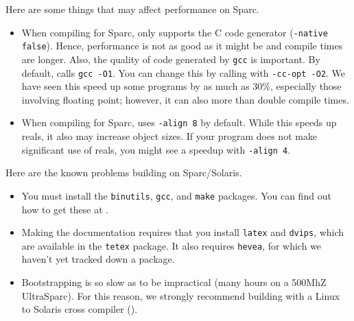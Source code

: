 
Here are some things that may affect performance on Sparc.
\begin{itemize}

\item
When compiling for Sparc, {\mlton} only supports the C code generator
({\tt -native false}).  Hence, performance is not as good as it might
be and compile times are longer.  Also, the quality of code generated
by {\tt gcc} is important.  By default, {\mlton} calls {\tt gcc -O1}.
You can change this by calling {\mlton} with {\tt -cc-opt -O2}.  We
have seen this speed up some programs by as much as 30\%, especially
those involving floating point; however, it can also more than double
compile times.

\item
When compiling for Sparc, {\mlton} uses {\tt -align 8} by default.
While this speeds up reals, it also may increase object sizes.  If
your program does not make significant use of reals, you might see a
speedup with {\tt -align 4}.

\end{itemize}
Here are the known problems building {\mlton} on Sparc/Solaris.

\begin{itemize}

\item You must install the {\tt binutils}, {\tt gcc}, and {\tt make}
packages.  You can find out how to get these at
.

\item Making the documentation requires that you install {\tt latex}
and {\tt dvips}, which are available in the {\tt tetex} package.  It
also requires {\tt hevea}, for which we haven't yet tracked down a
package.

\item Bootstrapping is so slow as to be impractical (many hours on a
500MhZ UltraSparc).  For this reason, we strongly recommend building
with a Linux to Solaris cross compiler ().

\end{itemize}
